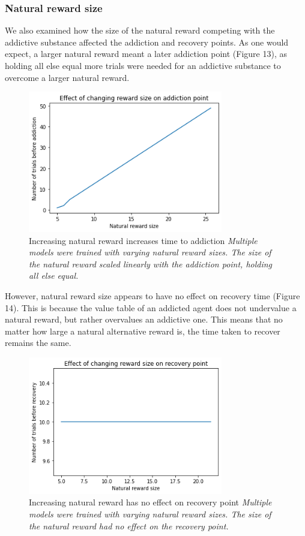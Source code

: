 \documentclass[10pt,letterpaper]{article}
\begin{document}
\subsubsection{Natural reward size}
We also examined how the size of the natural reward competing with the addictive substance affected the addiction and recovery points. As one would expect, a larger natural reward meant a later addiction point (Figure 13), as holding all else equal more trials were needed for an addictive substance to overcome a larger natural reward.

\begin{figure}[H]
   \centering
    \includegraphics[width = 85mm]{graphs/reward_addiction.png}
    \caption{Increasing natural reward increases time to addiction
    \newline \emph{Multiple models were trained with varying natural reward sizes. The size of the natural reward scaled linearly with the addiction point, holding all else equal.}}
    \label{fig:Baseline}
\end{figure}

However, natural reward size appears to have no effect on recovery time (Figure 14). This is because the value table of an addicted agent does not undervalue a natural reward, but rather overvalues an addictive one. This means that no matter how large a natural alternative reward is, the time taken to recover remains the same.

\begin{figure}[H]
   \centering
    \includegraphics[width = 85mm]{graphs/reward_recovery.png}
    \caption{Increasing natural reward has no effect on recovery point
    \newline \emph{Multiple models were trained with varying natural reward sizes. The size of the natural reward had no effect on the recovery point.}}
    \label{fig:Baseline}
\end{figure}
\end{document}
